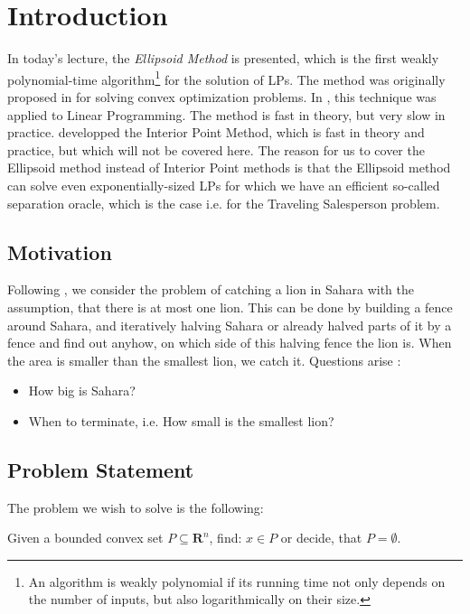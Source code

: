 \documentclass[10pt]{article}
\newcommand{\R}{\mathbf{R}}
\begin{document}


\section{Introduction}
In today's lecture, the \emph{Ellipsoid Method} is presented, which is the first weakly polynomial-time algorithm\footnote{An algorithm is weakly polynomial if its running time not only depends on the number of inputs, but also logarithmically on their size.} for the solution of LPs. The method was originally proposed in \cite{shor77} for solving convex optimization problems. In \cite{khachiyan79}, this technique was applied to Linear Programming. The method is fast in theory, but very slow in practice. \cite{karmarkar89} developped the Interior Point Method, which is fast in theory and practice, but which will not be covered here. The reason for us to cover the Ellipsoid method instead of Interior Point methods is that the Ellipsoid method can solve even exponentially-sized LPs for which we have an efficient so-called separation oracle, which is the case i.e. for the Traveling Salesperson problem. 

\subsection{Motivation}
Following \cite{lovaszschrijver}, we consider the problem of catching a lion in Sahara with the assumption, that there is at most one lion. This can be done by building a fence around Sahara, and iteratively halving Sahara or already halved parts of it by a fence and find out anyhow, on which side of this halving fence the lion is. When the area is smaller than the smallest lion, we catch it. Questions arise :
\begin{itemize}
\item How big is Sahara?
\item When to terminate, i.e. How small is the smallest lion?
\end{itemize}

\subsection{Problem Statement}
The problem we wish to solve is the following:

Given a bounded convex set $P\subseteq \R^n$, find: $x \in P$ or decide, that $P = \emptyset$.
\end{document}
